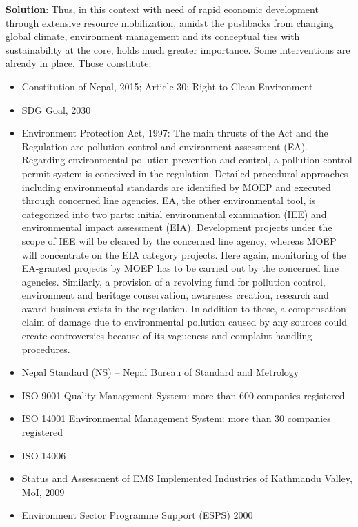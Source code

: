 \documentclass[
]{book}
\newenvironment{solution}{ {\bfseries Solution}:}{}
\begin{document}
\begin{questions}
\begin{solution}
Thus, in this context with need of rapid economic development through extensive resource mobilization, amidst the pushbacks from changing global climate, environment management and its conceptual ties with sustainability at the core, holds much greater importance. Some interventions are already in place. Those constitute:

\begin{itemize}
\item Constitution of Nepal, 2015; Article 30: Right to Clean Environment
\item SDG Goal, 2030
\item Environment Protection Act, 1997: The main thrusts of the Act and the Regulation are pollution control and environment assessment (EA). Regarding environmental pollution prevention and control, a pollution control permit system is conceived in the regulation. Detailed procedural approaches including environmental standards are identified by MOEP and executed through concerned line agencies. EA, the other environmental tool, is categorized into two parts: initial environmental examination (IEE) and environmental impact assessment (EIA). Development projects under the scope of IEE will be cleared by the concerned line agency, whereas MOEP will concentrate on the EIA category projects. Here again, monitoring of the EA-granted projects by MOEP has to be carried out by the concerned line agencies. Similarly, a provision of a revolving fund for pollution control, environment and heritage conservation, awareness creation, research and award business exists in the regulation. In addition to these, a compensation claim of damage due to environmental pollution caused by any sources could create controversies because of its vagueness and complaint handling procedures.
\item Nepal Standard (NS) -- Nepal Bureau of Standard and Metrology
\item ISO 9001 Quality Management System: more than 600 companies registered
\item ISO 14001 Environmental Management System: more than 30 companies registered
\item ISO 14006
\item Status and Assessment of EMS Implemented Industries of Kathmandu Valley, MoI, 2009 
\item Environment Sector Programme Support (ESPS) 2000
\end{itemize}

\end{solution}


\end{questions}
\end{document}

